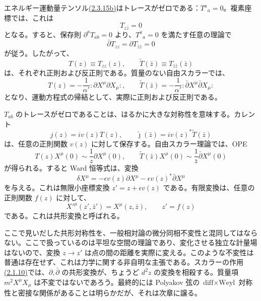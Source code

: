 \label{sec:2.4}

エネルギー運動量テンソル\hyperref[eq:2.3.15b]{(2.3.15b)}はトレースがゼロである：$T^a{}_a=0$。複素座標では、これは
\begin{equation}
T_{z\bar z}=0
\tag{2.4.1}\label{eq:2.4.1}
\end{equation}
となる。すると、保存則 $\partial^aT_{ab}=0$ より、$T^a{}_a=0$ を満たす任意の理論で
\begin{equation}
\bar\partial T_{zz}=\partial T_{\bar z\bar z}=0
\tag{2.4.2}\label{eq:2.4.2}
\end{equation}
が従う。したがって、
\begin{equation}
T(z)\equiv T_{zz}(z),\qquad
\widetilde T(\bar z)\equiv T_{\bar z\bar z}(\bar z)
\tag{2.4.3}\label{eq:2.4.3}
\end{equation}
は、それぞれ正則および反正則である。質量のない自由スカラーでは、
\begin{equation}
T(z)=-\frac1{\alpha'}:\partial X^\mu\partial X_\mu:,\qquad
\widetilde T(\bar z)=-\frac1{\alpha'}:\bar\partial X^\mu\bar\partial X_\mu:
\tag{2.4.4}\label{eq:2.4.4}
\end{equation}
となり、運動方程式の帰結として、実際に正則および反正則である。

$T_{ab}$ のトレースがゼロであることは、はるかに大きな対称性を意味する。カレント
\begin{equation}
j(z)=iv(z)T(z),\qquad
\tilde{\jmath}(\bar z)=iv(z)^*\widetilde T(\bar z)
\tag{2.4.5}\label{eq:2.4.5}
\end{equation}
は、任意の正則関数 $v(z)$ に対して保存する。自由スカラー理論では、OPE
\begin{equation}
T(z)X^\mu(0)\sim\frac1z\partial X^\mu(0),\qquad
\widetilde T(\bar z)X^\mu(0)\sim\frac1{\bar z}\bar\partial X^\mu(0)
\tag{2.4.6}\label{eq:2.4.6}
\end{equation}
が得られる。すると Ward 恒等式は、変換
\begin{equation}
\delta X^\mu=-\epsilon v(z)\partial X^\mu
-\epsilon v(z)^*\bar\partial X^\mu
\tag{2.4.7}\label{eq:2.4.7}
\end{equation}
を与える。これは無限小座標変換 $z'=z+\epsilon v(z)$ である。有限変換は、任意の正則関数 $f(z)$ に対して、
\begin{equation}
X'^\mu(z',\bar z')=X^\mu(z,\bar z),\qquad z'=f(z)
\tag{2.4.8}\label{eq:2.4.8}
\end{equation}
である。これは共形変換と呼ばれる。

ここで見いだした共形対称性を、一般相対論の微分同相不変性と混同してはならない。ここで扱っているのは平坦な空間の理論であり、変化させる独立な計量場はないので、変換 $z\to z'$ は点の間の距離を実際に変える。このような不変性は普通は存在せず、これは力学に関する非自明な主張である。スカラーの作用\hyperref[eq:2.1.10]{(2.1.10)}では、$\partial,\bar\partial$ の共形変換が、ちょうど $d^2z$ の変換を相殺する。質量項 $m^2X^\mu X_\mu$ は不変ではないであろう。最終的には Polyakov 弦の $\text{diff}\times\text{Weyl}$ 対称性と密接な関係があることは明らかだが、それは次章に譲る。


